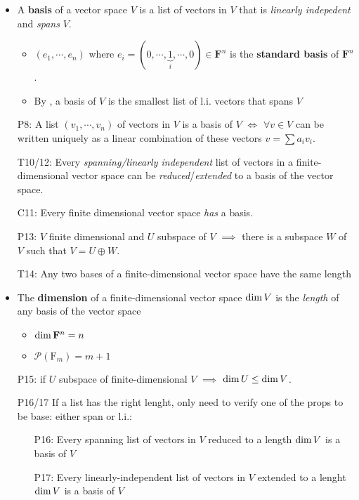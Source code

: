 \begin{itemize}
\item A \textbf{basis} of a vector space $V$ is a list of vectors in $V$ that is \emph{linearly indepedent} and \emph{spans} $V$.
\begin{itemize}
\item $(e_1, \cdots, e_n)$ where $e_i=(0,\cdots, \underbrace{1}_{i},\cdots,0)\in\mathbf{F}^n$ is the \textbf{standard basis} of $\mathbf{F}^n$. 
\item By , a basis of $V$ is the smallest list of l.i. vectors that spans $V$
\end{itemize}
\item[P8:] A list $(v_1,\cdots,v_n)$ of vectors in $V$ is a basis of $V$ $\iff$ $\forall v\in V$ can be written uniquely as a linear combination of these vectors $v=\sum a_i v_i$.
\item[T10/12:] Every \emph{spanning/linearly independent}  list of vectors in a finite-dimensional vector space can be \emph{reduced}/\emph{extended} to a basis of the vector space.
\item[C11:] Every finite dimensional vector space \emph{has} a basis.
\item[P13:] $V$ finite dimensional and $U$ subspace of $V$ $\implies$ there is a subspace $W$ of $V$ such that $V=U\oplus W$.
%
\item[T14:] Any two bases of a finite-dimensional vector space have the same length
\item The \textbf{dimension} of a finite-dimensional vector space $\operatorname{dim}{V}$ is the \emph{length} of any basis of the vector space
\begin{itemize}
  \item $\operatorname{dim}{\mathbf{F}^n} = n$
  \item $\mathcal{P}(\mathrm{F}_m) = m+1$
\end{itemize}
\item[P15:] if $U$  subspace of finite-dimensional $V$ $\implies$ $\operatorname{dim}{U}\leq\operatorname{dim}{V}$.
%
\item[P16/17] If a list has the right lenght, only need to verify one of the props to be base: either span or l.i.:
\begin{itemize}
  \item[P16:\label{it:T2_16}]Every spanning list of vectors in $V$ reduced to a length $\operatorname{dim}{V}$ is a basis of $V$ 
  \item[P17:\label{it:T2_17}]Every linearly-independent list of vectors in $V$ extended to a lenght $\operatorname{dim}{V}$ is a basis of $V$
\end{itemize}

\end{itemize}
